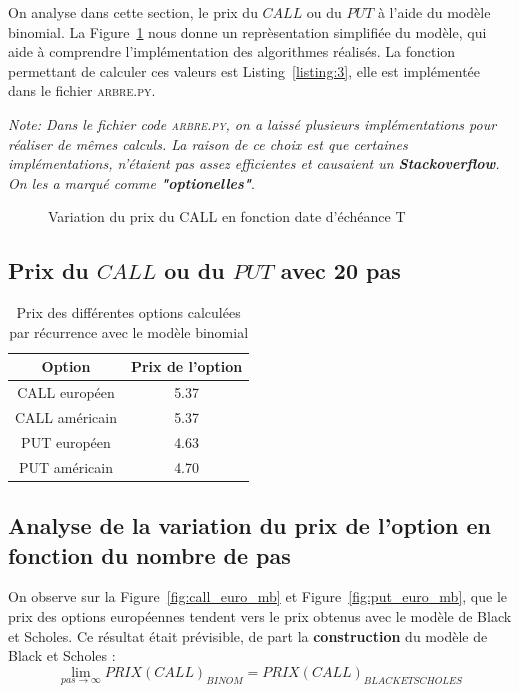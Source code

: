 

On analyse dans cette section, le prix du $CALL$ ou du $PUT$ à l'aide du modèle binomial. La Figure~\ref{fig:arbre} nous donne un reprèsentation simplifiée du modèle, qui aide à comprendre l'implémentation des algorithmes réalisés. 
La fonction permettant de calculer ces valeurs est Listing~\ref{listing:3}, elle est implémentée dans le fichier \textsc{arbre.py}.

\emph{Note: Dans le fichier code \textsc{arbre.py}, on a laissé plusieurs implémentations pour réaliser de mêmes calculs. La raison de ce choix est que certaines implémentations, n'étaient pas assez efficientes et causaient un \textbf{Stackoverflow}. On les a marqué comme \textbf{"optionelles"}}.

\begin{figure}[H]
\centering

\caption{Variation du prix du CALL en fonction date d'échéance T}
\label{fig:arbre}
\end{figure}

\subsection{Prix du $CALL$ ou du $PUT$ avec 20 pas} %
\label{sub:prix_du_call_ou_du_put_avec_20_pas}

\begin{table}[H]
	\centering
\begin{tabular}{|c|c|}
\hline
Option & Prix de l'option\\
\hline
CALL européen & 5.37\\
\hline
CALL américain & 5.37\\
\hline
PUT européen & 4.63\\
\hline
PUT américain & 4.70\\
\hline 
\end{tabular}
\caption{Prix des différentes options calculées par récurrence avec le modèle binomial}
\label{tab:prix-20}
\end{table}

\subsection{Analyse de la variation du prix de l'option en fonction du nombre de pas} %
\label{sub:analyse_de_la_variation_du_prix_de_l_option_en_fonction_du_nombre_de_pas}

On observe sur la Figure~\ref{fig:call_euro_mb} et Figure~\ref{fig:put_euro_mb}, que le prix des options européennes tendent vers le prix obtenus avec le modèle de Black et Scholes. Ce résultat était prévisible, de part la \textbf{construction} du modèle de Black et Scholes :
$$\lim_{pas\rightarrow \infty} PRIX(CALL)_{BINOM}=PRIX(CALL)_{BLACK ET SCHOLES}$$

